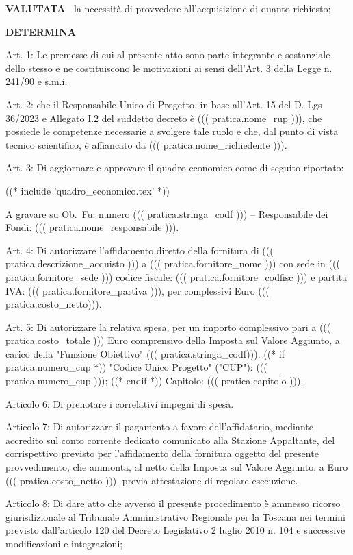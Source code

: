 \textbf{VALUTATA~} la necessità di provvedere all'acquisizione
di quanto richiesto;

\begin{center}
	\textbf{DETERMINA}
\end{center}

Art. 1: Le premesse di cui al presente atto sono parte integrante e
sostanziale dello stesso e ne costituiscono le motivazioni ai sensi
dell'Art. 3 della Legge n. 241/90 e s.m.i.

Art. 2: che il Responsabile Unico di Progetto, in base all'Art. 15 del
D. Lgs 36/2023 e Allegato I.2 del suddetto decreto è ((( pratica.nome_rup ))),
che possiede le competenze necessarie a svolgere tale ruolo
e che, dal punto di vista tecnico scientifico, è affiancato da
((( pratica.nome_richiedente ))).

Art. 3: Di aggiornare e approvare il quadro economico come di seguito riportato:

((* include 'quadro_economico.tex' *))

A gravare su Ob.~Fu. numero ((( pratica.stringa_codf ))) – Responsabile dei
Fondi: ((( pratica.nome_responsabile ))).

Art. 4: Di autorizzare l'affidamento diretto della fornitura di ((( pratica.descrizione_acquisto ))) a
((( pratica.fornitore_nome ))) con sede in  ((( pratica.fornitore_sede )))
codice fiscale: ((( pratica.fornitore_codfisc ))) e partita IVA:
((( pratica.fornitore_partiva ))), per complessivi Euro ((( pratica.costo_netto))).

Art. 5: Di autorizzare la relativa spesa, per un importo complessivo
pari a ((( pratica.costo_totale ))) Euro comprensivo della Imposta sul
Valore Aggiunto, a carico della "Funzione Obiettivo" ((( pratica.stringa_codf))).
((* if pratica.numero_cup *)) "Codice Unico Progetto" ("CUP"): ((( pratica.numero_cup ))); ((* endif *))
Capitolo: ((( pratica.capitolo ))).

Articolo 6: Di prenotare i correlativi impegni di spesa.

Articolo 7: Di autorizzare il pagamento a favore dell'affidatario,
mediante accredito sul conto corrente dedicato comunicato alla Stazione
Appaltante, del corrispettivo previsto per l'affidamento della
fornitura oggetto del presente provvedimento, che ammonta, al netto
della Imposta sul Valore Aggiunto, a Euro ((( pratica.costo_netto ))),
previa attestazione di regolare esecuzione.

Articolo 8: Di dare atto che avverso il presente procedimento è ammesso
ricorso giurisdizionale al Tribunale Amministrativo Regionale per la
Toscana nei termini previsto dall'articolo 120 del Decreto Legislativo
2 luglio 2010 n. 104 e successive modificazioni e integrazioni;

